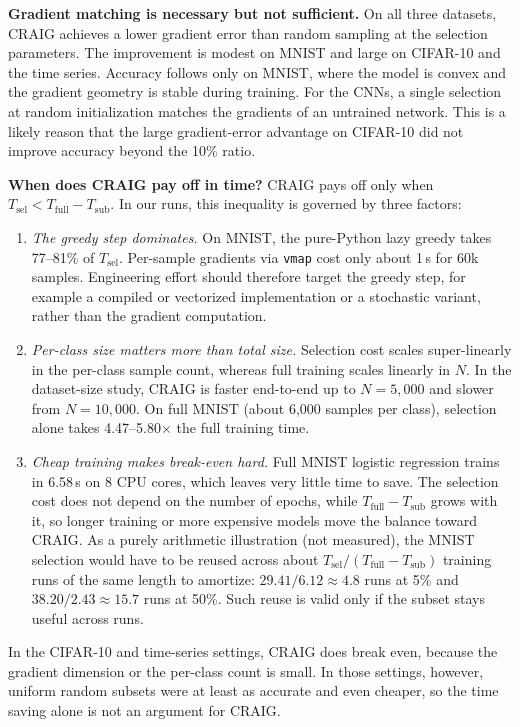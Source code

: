 \documentclass[conference]{IEEEtran}
\newcommand{\Tsel}{T_{\mathrm{sel}}}
\newcommand{\Tsub}{T_{\mathrm{sub}}}
\newcommand{\Tfull}{T_{\mathrm{full}}}
\begin{document}
\textbf{Gradient matching is necessary but not sufficient.} On all three datasets, CRAIG achieves a lower gradient error than random sampling at the selection parameters. The improvement is modest on MNIST and large on CIFAR-10 and the time series. Accuracy follows only on MNIST, where the model is convex and the gradient geometry is stable during training. For the CNNs, a single selection at random initialization matches the gradients of an untrained network. This is a likely reason that the large gradient-error advantage on CIFAR-10 did not improve accuracy beyond the 10\% ratio.

\textbf{When does CRAIG pay off in time?} CRAIG pays off only when $\Tsel<\Tfull-\Tsub$. In our runs, this inequality is governed by three factors:
\begin{enumerate}
\item \emph{The greedy step dominates.} On MNIST, the pure-Python lazy greedy takes 77--81\% of $\Tsel$. Per-sample gradients via \texttt{vmap} cost only about 1\,s for 60k samples. Engineering effort should therefore target the greedy step, for example a compiled or vectorized implementation or a stochastic variant, rather than the gradient computation.
\item \emph{Per-class size matters more than total size.} Selection cost scales super-linearly in the per-class sample count, whereas full training scales linearly in $N$. In the dataset-size study, CRAIG is faster end-to-end up to $N{=}5{,}000$ and slower from $N{=}10{,}000$. On full MNIST (about 6,000 samples per class), selection alone takes 4.47--5.80$\times$ the full training time.
\item \emph{Cheap training makes break-even hard.} Full MNIST logistic regression trains in 6.58\,s on 8 CPU cores, which leaves very little time to save. The selection cost does not depend on the number of epochs, while $\Tfull-\Tsub$ grows with it, so longer training or more expensive models move the balance toward CRAIG. As a purely arithmetic illustration (not measured), the MNIST selection would have to be reused across about $\Tsel/(\Tfull-\Tsub)$ training runs of the same length to amortize: $29.41/6.12\approx4.8$ runs at 5\% and $38.20/2.43\approx15.7$ runs at 50\%. Such reuse is valid only if the subset stays useful across runs.
\end{enumerate}
In the CIFAR-10 and time-series settings, CRAIG does break even, because the gradient dimension or the per-class count is small. In those settings, however, uniform random subsets were at least as accurate and even cheaper, so the time saving alone is not an argument for CRAIG.
\end{document}
